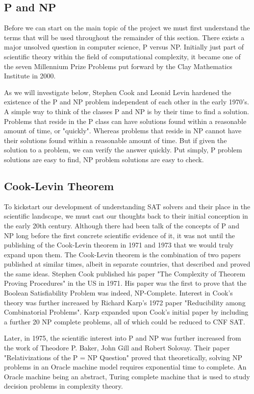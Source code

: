 \documentclass{article}
\begin{document}
\subsection{P and NP}
Before we can start on the main topic of the project we must first understand the terms that will be used throughout the remainder of this
section. There exists a major unsolved question in computer science, P versus NP. Initially just part of scientific theory within the field
of computational complexity, it became one of the seven Millennium Prize Problems put forward by the Clay Mathematics Institute in 2000.

As we will investigate below, Stephen Cook and Leonid Levin hardened the existence of the P and NP problem independent of each other in the early 1970's. A
simple way to think of the classes P and NP is by their time to find a solution. Problems that reside in the P class can have solutions
found within a reasonable amount of time, or "quickly". Whereas problems that reside in NP cannot have their solutions found within a
reasonable amount of time. But if given the solution to a problem, we can verify the answer quickly. Put simply, P problem solutions are
easy to find, NP problem solutions are easy to check.

\subsection{Cook-Levin Theorem}
To kickstart our development of understanding SAT solvers and their place in the scientific landscape, we must cast our thoughts back to their
initial conception in the early 20th century. Although there had been talk of the concepts of P and NP long before the first concrete
scientific evidence of it, it was not until the publishing of the Cook-Levin theorem in 1971 and 1973 that we would truly expand upon them.
The Cook-Levin theorem is the combination of two papers published at similar times, albeit in separate countries, that described and proved
the same ideas. Stephen Cook published his paper "The Complexity of Theorem Proving Procedures" in the US in 1971\cite{scook}. His paper was the
first to prove that the Boolean Satisfiability Problem was indeed, NP-Complete. Interest in Cook's theory was further increased by Richard
Karp's 1972 paper "Reducibility among Combinatorial Problems"\cite{karp}. Karp expanded upon Cook's initial paper by including a further 20 NP complete
problems, all of which could be reduced to CNF SAT.

Later, in 1975, the scientific interest into P and NP was further increased from the work of Theodore P. Baker, John Gill and Robert
Solovay. Their paper "Relativizations of the P = NP Question" proved that theoretically, solving NP problems in an Oracle machine model
requires exponential time to complete\cite{pnp}. An Oracle machine being an abstract, Turing complete machine that is used to study decision
problems in complexity theory.
\end{document}
